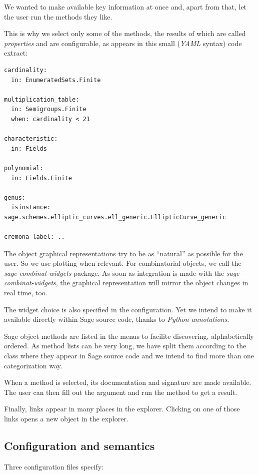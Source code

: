 \documentclass{deliverablereport}
\begin{document}
We wanted to make available key information at once and, apart from
that, let the user run the methods they like.

This is why we select only some of the methods, the results of which
are called \emph{properties} and are configurable, as appears in this
small (\emph{YAML} syntax) code extract:

\begin{lstlisting}
cardinality:
  in: EnumeratedSets.Finite

multiplication_table:
  in: Semigroups.Finite
  when: cardinality < 21

characteristic:
  in: Fields

polynomial:
  in: Fields.Finite

genus:
  isinstance: sage.schemes.elliptic_curves.ell_generic.EllipticCurve_generic

cremona_label: ..
\end{lstlisting}

The object graphical representations try to be as ``natural'' as
possible for the user. So we use plotting when relevant. For
combinatorial objects, we call the \emph{sage-combinat-widgets}
package. As soon as integration is made with the \emph{sage-combinat-widgets},
the graphical representation will mirror the object changes in real
time, too.

The widget choice is also specified in the configuration. Yet we
intend to make it available directly within Sage source code, thanks
to \emph{Python annotations}.

Sage object methods are listed in the menus to facilite
discovering, alphabetically ordered. As method lists can be very long,
we have split them according to the class where they appear in Sage source
code and we intend to find more than one categorization way.

When a method is selected, its documentation and signature are made
available. The user can then fill out the argument and run the method
to get a result.

Finally, links appear in many places in the explorer. Clicking on one
of those links opens a new object in the explorer.

\subsection{Configuration and semantics}
\label{semantics}

Three configuration files specify:
\end{document}

